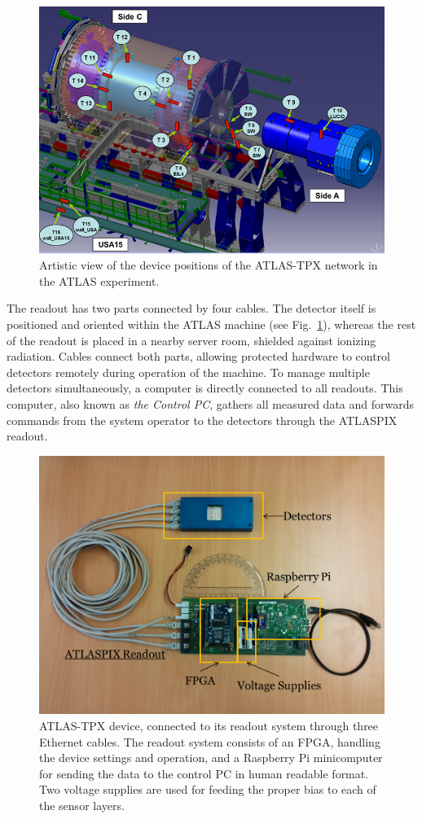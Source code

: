 \documentclass[journal]{IEEEtran}
\begin{document}
\begin{figure}[tbp]
	\centering
        \includegraphics[clip, width=.45\textwidth, angle = 0 ]{Plots/ATLASTPX.png}
      \caption {Artistic view of the device positions of the ATLAS-TPX network in the ATLAS experiment.}
    \label{fig:positions}
\end{figure}

The readout has two parts connected by four cables. The detector itself is positioned and oriented within the ATLAS machine (see Fig.~\ref{fig:positions}), whereas the rest of the readout is placed in a nearby server room, shielded against ionizing radiation. Cables connect both parts, allowing protected hardware to control detectors remotely during operation of the machine. To manage multiple detectors simultaneously, a computer is directly connected to all readouts. This computer, also known as \textit{the Control PC}, gathers all measured data and forwards commands from the system operator to the detectors through the ATLASPIX readout.

\begin{figure}[tbp]
	\centering
        \includegraphics[clip,width=.45\textwidth, angle = 0 ]{Plots/ATLASPIX.png}
      \caption {ATLAS-TPX device, connected to its readout system through three Ethernet cables. The readout system consists of an FPGA, handling the device settings and operation, and a Raspberry Pi minicomputer for sending the data to the control PC in human readable format. Two voltage supplies are used for feeding the proper bias to each of the sensor layers.}
    \label{fig:device_with_readout}
\end{figure}
\end{document}
